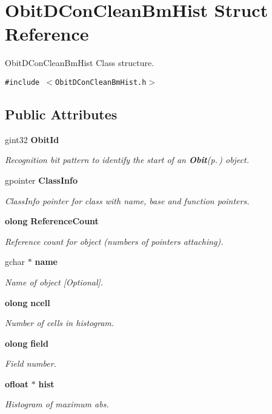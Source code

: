 \section{Obit\-DCon\-Clean\-Bm\-Hist Struct Reference}
\label{structObitDConCleanBmHist}
Obit\-DCon\-Clean\-Bm\-Hist Class structure.  


{\tt \#include $<$Obit\-DCon\-Clean\-Bm\-Hist.h$>$}

\subsection*{Public Attributes}
\begin{CompactItemize}
\item 
gint32 {\bf Obit\-Id}
\begin{CompactList}\small\item\em Recognition bit pattern to identify the start of an {\bf Obit}{\rm (p.\,\pageref{structObit})} object. \item\end{CompactList}\item 
gpointer {\bf Class\-Info}
\begin{CompactList}\small\item\em Class\-Info pointer for class with name, base and function pointers. \item\end{CompactList}\item 
{\bf olong} {\bf Reference\-Count}
\begin{CompactList}\small\item\em Reference count for object (numbers of pointers attaching). \item\end{CompactList}\item 
gchar $\ast$ {\bf name}
\begin{CompactList}\small\item\em Name of object [Optional]. \item\end{CompactList}\item 
{\bf olong} {\bf ncell}
\begin{CompactList}\small\item\em Number of cells in histogram. \item\end{CompactList}\item 
{\bf olong} {\bf field}
\begin{CompactList}\small\item\em Field number. \item\end{CompactList}\item 
{\bf ofloat} $\ast$ {\bf hist}
\begin{CompactList}\small\item\em Histogram of maximum abs. \item\end{CompactList}\end{CompactItemize}


